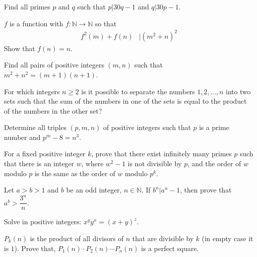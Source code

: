 \documentclass[problems.tex]{subfile}
\begin{document}
	\begin{problem}
		Find all primes $p$ and $q$ such that $p | 30q-1$ and $q | 30p-1$.
	\end{problem}
	
	\begin{problem}
		$f$ is a function with $f:\mathbb{N}\to\mathbb{N} $ so that	
			\begin{align*}
				f^2(m)+f(n) & | (m^2+n)^2
			\end{align*}
		Show that $f(n)=n$.
	\end{problem}
	
	\begin{problem}[Columbia $2010$]
		Find all pairs of positive integers $(m,n)$ such that $m^2+n^2=(m+1)(n+1)$.
	\end{problem}
	
	\begin{problem}
		For which integers $n\geq2$ is it possible to separate the numbers $1, 2,\ldots, n$ into two sets such that the sum of the numbers in one of the sets is equal to the product of the numbers in the other set?
	\end{problem}
	
	\begin{problem}[Greece]
		Determine all triples $(p, m, n)$ of positive integers such that $p$ is a prime number and $p^m-8=n^3$.
	\end{problem}
	
	\begin{problem}
		For a fixed positive integer $k$, prove that there exist infinitely many primes $p$ such that there is an integer $w$, where $w^2-1$ is not divisible by $p$, and the order of $w$ modulo $p$ is the same as the order of $w$ modulo $p^k$.
	\end{problem}
	
	\begin{problem}
		Let $a>b>1$ and $b$ be an odd integer, $n\in\mathbb{N}$. If $b^n|a^n-1$, then prove that $a^b>\dfrac{3^n}{n}$.
	\end{problem}
	
	\begin{problem}[Kazakhstan $2015$]
		Solve in positive integers: $x^yy^x = (x+y)^z$.
	\end{problem}
	
	\begin{problem}[Kazakhstan $2015$]
		$P_k(n)$ is the product of all divisors of $n$ that are divisible by $k$ (in empty case it is $1$). Prove that, $P_1(n)\cdot P_2(n)\cdots P_n(n)$ is a perfect square.
	\end{problem}
	
\end{document}
